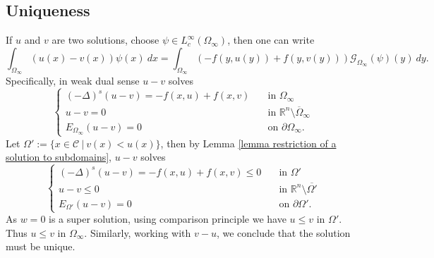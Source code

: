 \documentclass{amsart}
\newcommand{\nc}{\normalcolor}
\newtheorem{remark}[theorem]{Remark}
\newcommand{\R}{\mathbb{R}}
\newcommand{\slap}{(-\Delta)^{s}}
\newcommand{\g}[1]{\mathcal{G}_{#1}}
\newcommand{\gk}[1]{\mathbb{G}_{#1}}
\newcommand{\Ds}{D_{s}}
\newcommand{\C}{\mathcal{C}}
\begin{document}
\subsection{Uniqueness}
If $u$ and $v$ are two solutions, choose $\psi\in L_{c}^{\infty}(\Omega_{\infty})$, then one can write
\begin{equation*}
    \int_{\Omega_{\infty}}(u(x)-v(x))\psi(x)\ dx=\int_{\Omega_{\infty}}\left(-f(y,u(y))+f(y,v(y))\right)\g{\Omega_{\infty}}(\psi)(y)\ dy. 
\end{equation*}
 Specifically, in weak dual sense $u-v$ solves 
\begin{equation*}
    \begin{cases}
        \slap (u-v)=-f(x,u)+f(x,v) \quad &\text{in } \Omega_{\infty}\\
        u-v=0 &\text{in } \R^{n}\setminus\overline{\Omega}_{\infty}\\
        E_{\Omega_{\infty}}(u-v)=0 &\text{on } \partial\Omega_{\infty}. 
    \end{cases}
\end{equation*}
Let $\Omega':=\{x\in \C~|~v(x)<u(x)\}$, then by Lemma \ref{lemma restriction of a solution to subdomains}, $u-v$ solves 
\begin{equation*}
    \begin{cases}
        \slap (u-v)=-f(x,u)+f(x,v)\leq 0 \quad &\text{in } \Omega'\\
        u-v\leq 0 &\text{in } \R^{n}\setminus\overline{\Omega'}\\
        E_{\Omega'}(u-v)=0 &\text{on } \partial\Omega' .
    \end{cases}
\end{equation*}
 As $w=0$ is a super solution, using comparison principle we have $u\leq v$ in $\Omega'$. Thus $u\leq v$ in $\Omega_{\infty}$. Similarly, working with $v-u$, we conclude that the solution must be unique.
\end{document}
